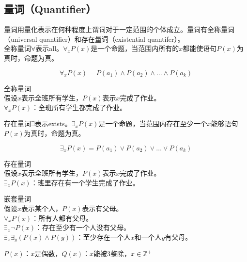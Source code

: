 \documentclass[12pt, openany, oneside]{book}
\begin{document}
\subsection{量词（Quantifier）}

量词用量化表示在何种程度上谓词对于一定范围的个体成立。量词有全称量词（universal quantifier）和存在量词（existential quantifer）。 \\

全称量词$ \forall $表示all。$ \forall_x P(x) $是一个命题，当范围内所有的$ x $都能使语句$ P(x) $为真时，命题为真。

$$
	\forall_x P(x) = P(a_1) \wedge P(a_2) \wedge \dots \wedge P(a_k)
$$

\begin{tcolorbox}
	全称量词 \\
	假设$ x $表示全班所有学生，$ P(x) $表示$ x $完成了作业。 \\
	$ \forall_x P(x) $：全班所有学生都完成了作业。
\end{tcolorbox}

存在量词$ \exists $表示exists。$ \exists_x P(x) $是一个命题，当范围内存在至少一个$ x $能够语句$ P(x) $为真时，命题为真。

$$
	\exists_x P(x) = P(a_1) \vee P(a_2) \vee \dots \vee P(a_k)
$$

\begin{tcolorbox}
	存在量词 \\
	假设$ x $表示全班所有学生，$ P(x) $表示$ x $完成了作业。 \\
	$ \exists_x P(x) $：班里存在有一个学生完成了作业。
\end{tcolorbox}

\begin{tcolorbox}
	嵌套量词 \\
	假设$ x $表示某个人，$ P(x) $表示有父母。 \\
	$ \forall_x P(x) $：所有人都有父母。 \\
	$ \exists_x \neg P(x) $：存在至少有一个人没有父母。 \\
	$ \exists_x \exists_y (P(x) \wedge P(y)) $：至少存在一个人$ x $和一个人$ y $有父母。
\end{tcolorbox}

\begin{tcolorbox}
	$ P(x) $：$ x $是偶数，$ Q(x) $：$ x $能被3整除，$ x \in \mathbb{Z}^+ $
	\begin{table}[H]
		\centering
	\end{table}
\end{tcolorbox}
\end{document}
